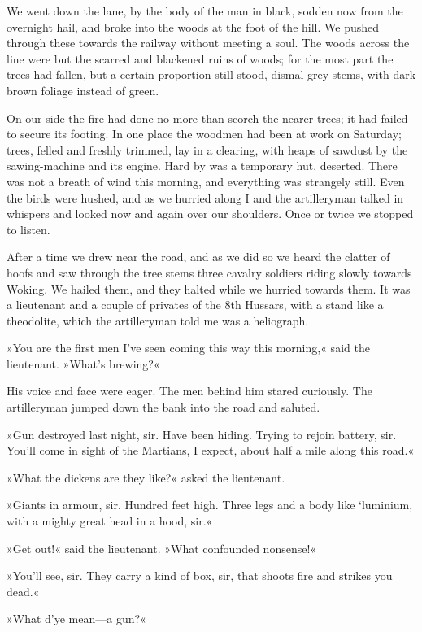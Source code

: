 We went down the lane, by the body of the man in black, sodden now from the overnight hail, and broke into the woods at the foot of the hill. We pushed through these towards the railway without meeting a soul. The woods across the line were but the scarred and blackened ruins of woods; for the most part the trees had fallen, but a certain proportion still stood, dismal grey stems, with dark brown foliage instead of green.

On our side the fire had done no more than scorch the nearer trees; it had failed to secure its footing. In one place the woodmen had been at work on Saturday; trees, felled and freshly trimmed, lay in a clearing, with heaps of sawdust by the sawing-machine and its engine. Hard by was a temporary hut, deserted. There was not a breath of wind this morning, and everything was strangely still. Even the birds were hushed, and as we hurried along I and the artilleryman talked in whispers and looked now and again over our shoulders. Once or twice we stopped to listen.



After a time we drew near the road, and as we did so we heard the clatter of hoofs and saw through the tree stems three cavalry soldiers riding slowly towards Woking. We hailed them, and they halted while we hurried towards them. It was a lieutenant and a couple of privates of the 8th Hussars, with a stand like a theodolite, which the artilleryman told me was a heliograph.

»You are the first men I've seen coming this way this morning,« said the lieutenant. »What's brewing?«

His voice and face were eager. The men behind him stared curiously. The artilleryman jumped down the bank into the road and saluted.

»Gun destroyed last night, sir. Have been hiding. Trying to rejoin battery, sir. You'll come in sight of the Martians, I expect, about half a mile along this road.«

»What the dickens are they like?« asked the lieutenant.

»Giants in armour, sir. Hundred feet high. Three legs and a body like `luminium, with a mighty great head in a hood, sir.«

»Get out!« said the lieutenant. »What confounded nonsense!«

»You'll see, sir. They carry a kind of box, sir, that shoots fire and strikes you dead.«

»What d'ye mean—a gun?«


